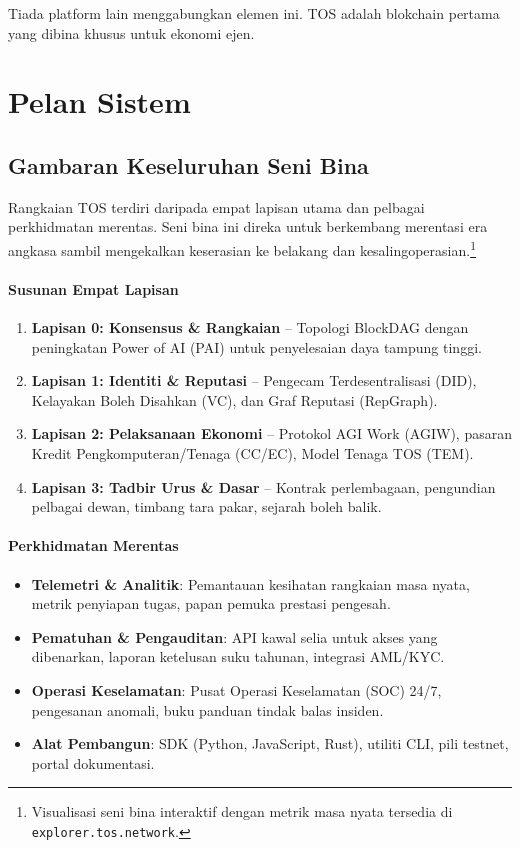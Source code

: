 \documentclass[11pt]{article}
\begin{document}
Tiada platform lain menggabungkan elemen ini. TOS adalah blokchain pertama yang dibina khusus untuk ekonomi ejen.

\section{Pelan Sistem}
\subsection{Gambaran Keseluruhan Seni Bina}
Rangkaian TOS terdiri daripada empat lapisan utama dan pelbagai perkhidmatan merentas. Seni bina ini direka untuk berkembang merentasi era angkasa sambil mengekalkan keserasian ke belakang dan kesalingoperasian.\footnote{Visualisasi seni bina interaktif dengan metrik masa nyata tersedia di \texttt{explorer.tos.network}.}

\paragraph{Susunan Empat Lapisan}
\begin{enumerate}[noitemsep]
  \item \textbf{Lapisan 0: Konsensus \& Rangkaian} -- Topologi BlockDAG dengan peningkatan Power of AI (PAI) untuk penyelesaian daya tampung tinggi.
  \item \textbf{Lapisan 1: Identiti \& Reputasi} -- Pengecam Terdesentralisasi (DID), Kelayakan Boleh Disahkan (VC), dan Graf Reputasi (RepGraph).
  \item \textbf{Lapisan 2: Pelaksanaan Ekonomi} -- Protokol AGI Work (AGIW), pasaran Kredit Pengkomputeran/Tenaga (CC/EC), Model Tenaga TOS (TEM).
  \item \textbf{Lapisan 3: Tadbir Urus \& Dasar} -- Kontrak perlembagaan, pengundian pelbagai dewan, timbang tara pakar, sejarah boleh balik.
\end{enumerate}

\paragraph{Perkhidmatan Merentas}
\begin{itemize}[noitemsep]
  \item \textbf{Telemetri \& Analitik}: Pemantauan kesihatan rangkaian masa nyata, metrik penyiapan tugas, papan pemuka prestasi pengesah.
  \item \textbf{Pematuhan \& Pengauditan}: API kawal selia untuk akses yang dibenarkan, laporan ketelusan suku tahunan, integrasi AML/KYC.
  \item \textbf{Operasi Keselamatan}: Pusat Operasi Keselamatan (SOC) 24/7, pengesanan anomali, buku panduan tindak balas insiden.
  \item \textbf{Alat Pembangun}: SDK (Python, JavaScript, Rust), utiliti CLI, pili testnet, portal dokumentasi.
\end{itemize}
\end{document}
